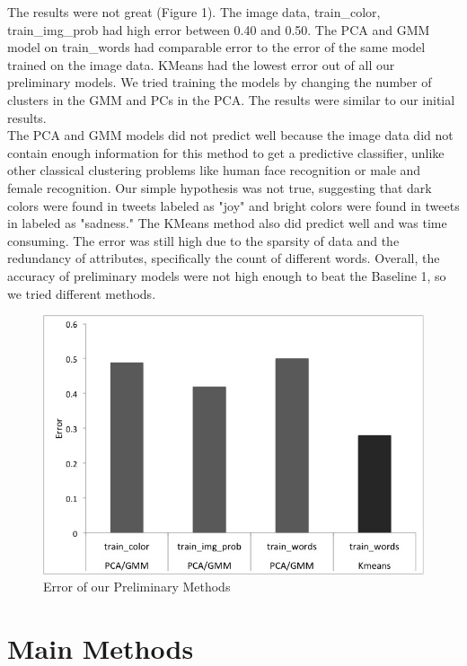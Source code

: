 \documentclass[]{article}
\begin{document}
The results were not great (Figure 1). The image data, train\_color, train\_img\_prob had high error between 0.40 and 0.50. The PCA and GMM model on train\_words had comparable error to the error of the same model trained on the image data. KMeans had the lowest error out of all our preliminary models. We tried training the models by changing the number of clusters in the GMM and PCs in the PCA. The results were similar to our initial results. \\

The PCA and GMM models did not predict well because the image data did not contain enough information for this method to get a predictive classifier, unlike other classical clustering problems like human face recognition or male and female recognition. Our simple hypothesis was not true, suggesting that dark colors were found in tweets labeled as "joy" and bright colors were found in tweets in labeled as "sadness." The KMeans method also did predict well and was time consuming. The error was still high due to the sparsity of data and the redundancy of attributes, specifically the count of different words. Overall, the accuracy of preliminary models were not high enough to beat the Baseline 1, so we tried different methods.
 

\begin{figure}
	\centering
  \includegraphics[scale=0.4]{trainingerror.jpg}
  \caption{Error of our Preliminary Methods}
  \label{fig:Error}
\end{figure}

\section{Main Methods}
\end{document}
